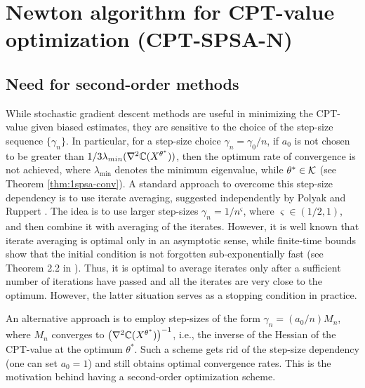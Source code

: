 \section{Newton algorithm for CPT-value optimization (CPT-SPSA-N)}
\label{sec:2spsa}
\subsection{Need for second-order methods}
While stochastic gradient descent methods are useful in minimizing the CPT-value given biased estimates, they are sensitive to the choice of the step-size sequence $\{\gamma_n\}$.  In particular, for a step-size choice $\gamma_n = \gamma_0/n$, if $a_0$ is not chosen to be greater than $1/3 \lambda_{min}(\nabla^2 \mathbb{C}(X^{\theta^*}))$, then the optimum rate of convergence is not achieved, where $\lambda_{\min}$ denotes the minimum eigenvalue, while $\theta^*\in \mathcal{K}$ (see Theorem \ref{thm:1spsa-conv}). A standard approach to overcome this step-size dependency is to use iterate averaging, suggested independently by Polyak \cite{polyak1992acceleration} and Ruppert \cite{ruppert1991stochastic}. The idea is to use larger step-sizes $\gamma_n = 1/n^\varsigma$, where $\varsigma \in (1/2,1)$, and then combine it with averaging of the iterates. However, it is well known  that iterate averaging is optimal only in an asymptotic sense, while finite-time bounds show that the initial condition is not forgotten sub-exponentially fast (see 
Theorem 2.2 in \cite{fathi2013transport}). Thus, it is optimal to average iterates only 
after a sufficient number of iterations have passed and all the iterates are very close to the optimum. However, the latter situation serves as a stopping condition in practice.

An alternative approach is to employ step-sizes of the form $\gamma_n = (a_0/n) M_n$, where $M_n$ converges to $\left(\nabla^2 \mathbb{C}(X^{\theta^*})\right)^{-1}$, i.e., the inverse of the Hessian of the CPT-value at the optimum $\theta^*$. Such a scheme gets rid of the step-size dependency (one can set $a_0=1$) and still obtains optimal convergence rates. This is the motivation behind having a second-order optimization scheme.

